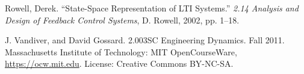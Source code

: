 \begin{thebibliography}{12}





Rowell, Derek. “State-Space Representation of LTI Systems.” \emph{2.14 Analysis and Design of Feedback Control Systems}, D. Rowell, 2002, pp. 1–18.




J. Vandiver, and David Gossard. 2.003SC Engineering Dynamics. Fall 2011. Massachusetts Institute of Technology: MIT OpenCourseWare, \url{https://ocw.mit.edu}. License: Creative Commons BY-NC-SA.




\end{thebibliography}



